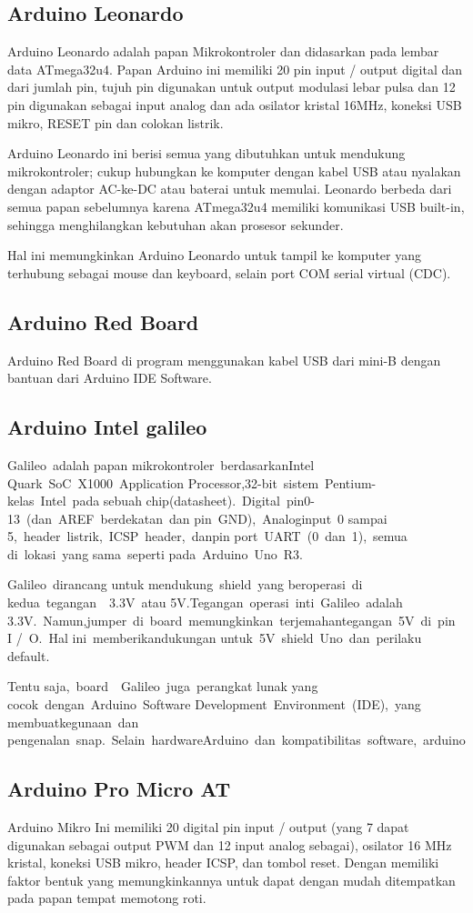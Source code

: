 \subsection {Arduino Leonardo}
Arduino Leonardo adalah papan Mikrokontroler dan didasarkan pada lembar data ATmega32u4. 
Papan Arduino ini memiliki 20 pin input / output digital dan dari jumlah pin, tujuh pin digunakan untuk output modulasi lebar pulsa dan 12 pin digunakan sebagai input analog dan ada osilator kristal 16MHz, koneksi USB mikro, RESET pin dan colokan listrik.

Arduino Leonardo ini berisi semua yang dibutuhkan untuk mendukung mikrokontroler; cukup hubungkan ke komputer dengan kabel USB atau nyalakan dengan adaptor AC-ke-DC atau baterai untuk memulai. 
Leonardo berbeda dari semua papan sebelumnya karena ATmega32u4 memiliki komunikasi USB built-in, sehingga menghilangkan kebutuhan akan prosesor sekunder.

Hal ini memungkinkan Arduino Leonardo untuk tampil ke komputer yang terhubung sebagai mouse dan keyboard, selain port COM serial virtual (CDC).

\subsection{Arduino Red Board}
Arduino Red Board di program menggunakan kabel USB dari mini-B dengan bantuan dari Arduino IDE Software.

\subsection{Arduino Intel galileo}
Galileo adalah papan mikrokontroler berdasarkanIntel Quark SoC X1000 Application Processor,32-bit sistem Pentium-kelas Intel pada sebuah chip(datasheet). Digital pin0-13 (dan AREF berdekatan dan pin GND), Analoginput 0 sampai 5, header listrik, ICSP header, danpin port UART (0 dan 1), semua di lokasi yang sama seperti pada Arduino Uno R3. 

Galileo dirancang untuk mendukung shield yang beroperasi di kedua tegangan  3.3V atau 5V.Tegangan operasi inti Galileo adalah 3.3V. Namun,jumper di board memungkinkan terjemahantegangan 5V di pin I / O. Hal ini memberikandukungan untuk 5V shield Uno dan perilaku default.

Tentu saja, board  Galileo juga perangkat lunak yang cocok dengan Arduino Software Development Environment (IDE), yang membuatkegunaan dan pengenalan snap. Selain hardwareArduino dan kompatibilitas software, arduino

\subsection{Arduino Pro Micro AT} 
Arduino Mikro Ini memiliki 20 digital pin input / output (yang 7 dapat digunakan sebagai output PWM dan 12 input analog sebagai), osilator 16 MHz kristal, koneksi USB mikro, header ICSP, dan tombol reset. Dengan  memiliki faktor bentuk yang memungkinkannya untuk dapat dengan mudah ditempatkan pada papan tempat memotong roti.
